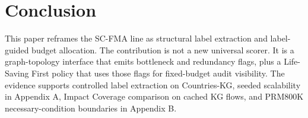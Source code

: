 \documentclass[pdflatex,sn-mathphys-num]{sn-jnl}
\begin{document}
\section{Conclusion}\label{sec:conclusion}

This paper reframes the SC-FMA line as structural label extraction and label-guided budget allocation. The contribution is not a new universal scorer. It is a graph-topology interface that emits bottleneck and redundancy flags, plus a Life-Saving First policy that uses those flags for fixed-budget audit visibility. The evidence supports controlled label extraction on Countries-KG, seeded scalability in Appendix A, Impact Coverage comparison on cached KG flows, and PRM800K necessary-condition boundaries in Appendix B.


\end{document}
